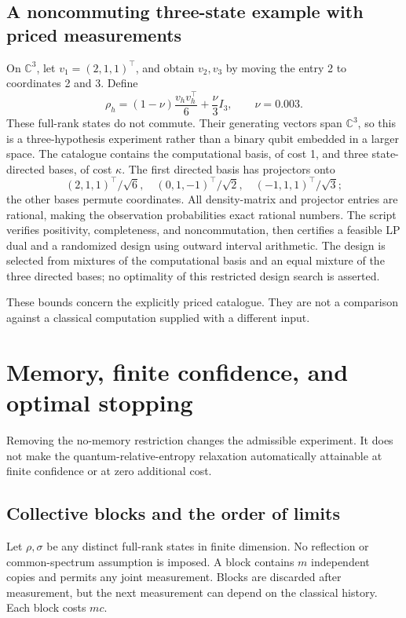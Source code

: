 \subsection{A noncommuting three-state example with priced measurements}
On $\mathbb C^3$, let $v_1=(2,1,1)^\top$, and obtain $v_2,v_3$ by
moving the entry 2 to coordinates 2 and 3. Define
\[
 \rho_h=(1-\nu)\frac{v_hv_h^\top}{6}+\frac\nu3 I_3,
 \qquad \nu=0.003.
\]
These full-rank states do not commute. Their generating vectors span
$\mathbb C^3$, so this is a three-hypothesis experiment rather than a
binary qubit embedded in a larger space. The catalogue contains the
computational basis, of cost 1, and three state-directed bases, of cost
$\kappa$. The first directed basis has projectors onto
\[
 (2,1,1)^\top/\sqrt6,\quad
 (0,1,-1)^\top/\sqrt2,\quad
 (-1,1,1)^\top/\sqrt3;
\]
the other bases permute coordinates. All density-matrix and projector
entries are rational, making the observation probabilities exact rational
numbers. The script verifies positivity, completeness, and noncommutation,
then certifies a feasible LP dual and a randomized design using outward
interval arithmetic. The design is selected from mixtures of the
computational basis and an equal mixture of the three directed bases;
no optimality of this restricted design search is asserted.



These bounds concern the explicitly priced catalogue. They are not a
comparison against a classical computation supplied with a different input.

\section{Memory, finite confidence, and optimal stopping}
\label{sec:memory-stopping}
Removing the no-memory restriction changes the admissible experiment.
It does not make the quantum-relative-entropy relaxation automatically
attainable at finite confidence or at zero additional cost.

\subsection{Collective blocks and the order of limits}
Let $\rho,\sigma$ be any distinct full-rank states in finite dimension.
No reflection or common-spectrum assumption is imposed. A block
contains $m$ independent copies and permits any joint measurement. Blocks are discarded after measurement, but the next
measurement can depend on the classical history. Each block costs $mc$.

